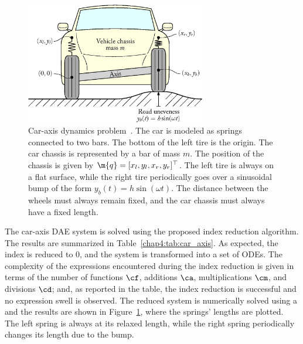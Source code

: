 \begin{figure}
  \centering
  \includegraphics[width=0.7\textwidth]{figures/chapter_4/car_axis}
  \caption{Car-axis dynamics problem~\cite{lioen1998test, mazzia2008test}. The car is modeled as springs connected to two bars. The bottom of the left tire is the origin. The car chassis is represented by a bar of mass $m$. The position of the chassis is given by $\m{q} = [x_l, y_l, x_r, y_r]^\top$. The left tire is always on a flat surface, while the right tire periodically goes over a sinusoidal bump of the form $y_b(t) = h\sin(\omega t)$. The distance between the wheels must always remain fixed, and the car chassis must always have a fixed length.}
  \label{chap4:fig:car_axis}
\end{figure}

The car-axis \ac{DAE} system is solved using the proposed index reduction algorithm. The results are summarized in Table~\ref{chap4:tab:car_axis}. As expected, the index is reduced to 0, and the system is transformed into a set of \acp{ODE}. The complexity of the expressions encountered during the index reduction is given in terms of the number of functions $\cf$, additions $\ca$, multiplications $\cm$, and divisions $\cd$; and, as reported in the table, the index reduction is successful and no expression swell is observed. The reduced system is numerically solved using a and the results are shown in Figure~\ref{chap4:fig:car_axis}, where the springs' lengths are plotted. The left spring is always at its relaxed length, while the right spring periodically changes its length due to the bump.

